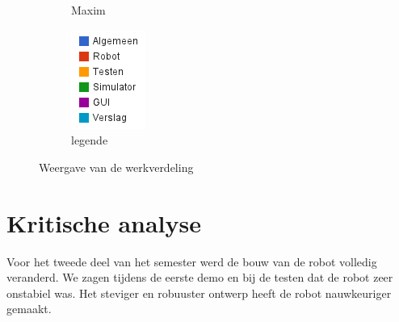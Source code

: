\documentclass[eind]{penoverslag}
\begin{document}
\begin{figure}[h]
\begin{subfigure}[hb]{0.15\textwidth}
                \caption{Maxim}
        \end{subfigure}%
        \begin{subfigure}[hb]{0.11\textwidth}
                \centering
                \includegraphics[width=\textwidth]{werk_legende}
                \caption{legende}
        \end{subfigure}
 \caption{Weergave van de werkverdeling}
\label{fig:werkverdeling}
\end{figure}

\section{Kritische analyse}
\label{Assec:kritischeAnalyse}


Voor het tweede deel van het semester werd de bouw van de robot volledig veranderd. We zagen tijdens de eerste demo en bij de testen dat de robot zeer onstabiel was. Het steviger en robuuster ontwerp heeft de robot nauwkeuriger gemaakt. 
\end{document}
